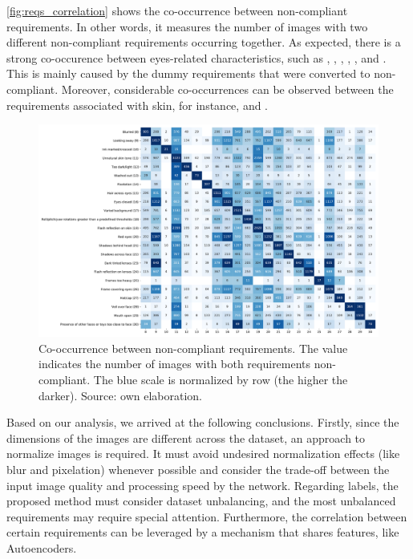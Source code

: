 \autoref{fig:reqs_correlation} shows the co-occurrence between non-compliant requirements. In other words, it measures the number of images with two different non-compliant requirements occurring together. As expected, there is a strong co-occurence between eyes-related characteristics, such as \lookingaway, \hairacrosseyes, \eyesclosed, \redeyes, \darktintedlenses, and \framecoveringeyes. This is mainly caused by the dummy requirements that were converted to non-compliant. Moreover, considerable co-occurrences can be observed between the requirements associated with skin, for instance, \unnaturalskintone and \flashskin. 
 
\begin{figure}[tb]
\centering
\includegraphics[width=\linewidth]{images/reqs/reqs_correlation.pdf}
\caption{Co-occurrence between non-compliant requirements. The value indicates the number of images with both requirements non-compliant. The blue scale is normalized by row (the higher the darker). Source: own elaboration.}
\label{fig:reqs_correlation}
\end{figure}
 
Based on our analysis, we arrived at the following conclusions. Firstly, since the dimensions of the images are different across the dataset, an approach to normalize images is required. It must avoid undesired normalization effects (like blur and pixelation) whenever possible and consider the trade-off between the input image quality and processing speed by the network. Regarding labels, the proposed method must consider dataset unbalancing, and the most unbalanced requirements may require special attention. Furthermore, the correlation between certain requirements can be leveraged by a mechanism that shares features, like Autoencoders.
 
